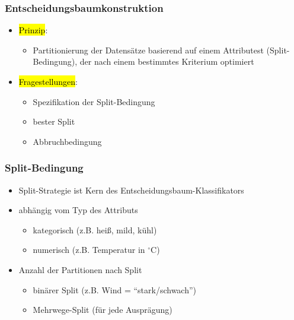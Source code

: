 \begin{frame}
\frametitle{Entscheidungsbaumkonstruktion}

\begin{itemize}
\item \hl{Prinzip}:
\begin{itemize}
\item Partitionierung der Datensätze basierend auf einem Attributest
  (Split-Bedingung), der nach einem bestimmtes Kriterium optimiert
\end{itemize}

\item \hl{Fragestellungen}:
\begin{itemize}
\item Spezifikation der Split-Bedingung
\item bester Split
\item Abbruchbedingung
\end{itemize}
\end{itemize}
\end{frame}

\begin{frame}
\frametitle{Split-Bedingung}

\begin{itemize}
\item Split-Strategie ist Kern des Entscheidungsbaum-Klassifikators
\item abhängig vom Typ des Attributs
\begin{itemize}
\item kategorisch (z.B. heiß, mild, kühl)
\item numerisch (z.B. Temperatur in $^\circ$C)
\end{itemize}
\item Anzahl der Partitionen nach Split
\begin{itemize}
\item binärer Split (z.B. Wind = "`stark/schwach"')
\item Mehrwege-Split (für jede Ausprägung)
\end{itemize}
\end{itemize}

\end{frame}

